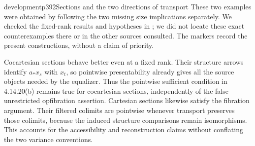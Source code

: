 \begin{dcomment}{development}{p392}{Sections and the two directions of transport}
These two examples were obtained by following the two missing size implications separately. We checked the fixed-rank results and hypotheses in \citet{Positselski2024Limits}; we did not locate these exact counterexamples there or in the other sources consulted. The markers record the present constructions, without a claim of priority.

Cocartesian sections behave better even at a fixed rank. Their structure arrows identify $a_*x_s$ with $x_t$, so pointwise presentability already gives all the source objects needed by the equalizer. Thus the pointwise sufficient condition in 4.14.20(b) remains true for cocartesian sections, independently of the false unrestricted opfibration assertion. Cartesian sections likewise satisfy the fibration argument. Their filtered colimits are pointwise whenever transport preserves those colimits, because the induced structure comparisons remain isomorphisms. This accounts for the accessibility and reconstruction claims without conflating the two variance conventions.
\end{dcomment}

